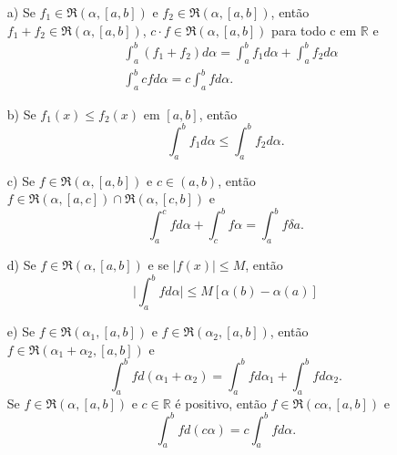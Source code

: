 \documentclass[Analysis/analysis_notes.tex]{subfiles}
\begin{document}
\begin{theorem*}
	\begin{itemize}
		\item[a)] Se \(f_1\in \mathfrak{R}(\alpha , [a, b])\) e \(f_2\in \mathfrak{R}(\alpha , [a, b])\), então \(f_1 + f_2\in \mathfrak{R}(\alpha , [a, b])\),
		      \(c \cdot f\in \mathfrak{R}(\alpha , [a, b])\) para todo c em \(\mathbb{R}\) e
		      \begin{align*}
			       & \int_{a}^{b} (f_1 + f_2)d\alpha = \int_{a}^{b}f_1d\alpha + \int_{a}^{b}f_2d\alpha \\
			       & \int_{a}^{b}cfd\alpha = c \int_{a}^{b}fd\alpha .
		      \end{align*}
		\item[b)] Se \(f_{1}(x)\leq f_{2}(x)\) em \([a, b]\), então
		      \[
			      \int_{a}^{b}f_{1}d\alpha \leq \int_{a}^{b}f_{2}d\alpha .
		      \]
		\item[c)] Se \(f\in \mathfrak{R}(\alpha , [a, b])\) e \(c\in (a, b)\), então \(f\in \mathfrak{R}(\alpha , [a, c])\cap \mathfrak{R}(\alpha ,[c, b])\) e
		      \[
			      \int_{a}^{c}fd\alpha + \int_{c}^{b}f\alpha  = \int_{a}^{b}f\delta a.
		      \]
		\item[d)] Se \(f\in \mathfrak{R}(\alpha , [a, b])\) e se \(|f(x)|\leq M\), então
		      \[
			      \biggl\vert \int_{a}^{b}fd\alpha  \biggr\vert \leq  M[\alpha (b) - \alpha (a)]
		      \]
		\item[e)] Se \(f\in \mathfrak{R}(\alpha_1, [a, b])\) e \(f\in \mathfrak{R}(\alpha _2, [a, b])\), então \(f\in \mathfrak{R}(\alpha _1 + \alpha _2, [a, b])\) e
		      \[
			      \int_{a}^{b}fd(\alpha_1 + \alpha_2) = \int_{a}^{b}fd\alpha _1 + \int_{a}^{b}fd\alpha _2.
		      \]
		      Se \(f\in \mathfrak{R}(\alpha , [a,b])\) e \(c\in \mathbb{R}\) é positivo, então \(f\in \mathfrak{R}(c\alpha, [a, b] )\) e
		      \[
			      \int_{a}^{b}fd(c\alpha) = c \int_{a}^{b}fd\alpha .
		      \]
	\end{itemize}
\end{theorem*}
\end{document}
